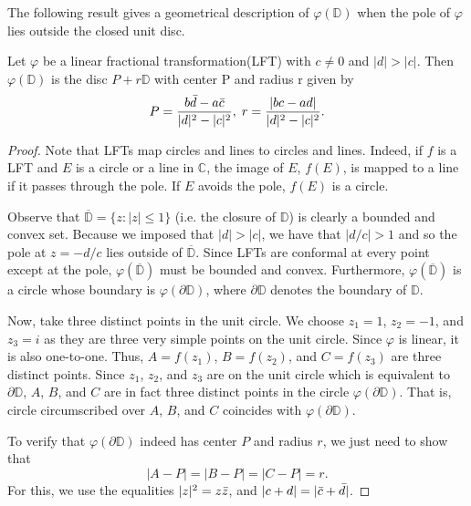 The following result gives a geometrical description of $\varphi(\mathbb{D})$ when the pole of $\varphi$ lies outside the closed unit disc.

\begin{lemma}
Let $\varphi$ be a linear fractional transformation(LFT) with $c \neq 0$ and $|d| > |c|$.  Then $\varphi(\mathbb{D})$ is the disc $P+r\mathbb{D}$ with center P and radius r given by
\[P = \frac{b\bar{d} - a\bar{c}}{|d|^2 - |c|^2}, \;r = \frac{|bc - ad|}{|d|^2 - |c|^2}.\]
\end{lemma}

\begin{proof}
Note that LFTs map circles and lines to circles and lines.  Indeed, if $f$ is a LFT and $E$ is a circle or a line in $\mathbb{C}$, the image of $E$, $f(E)$, is mapped to a line if it passes through the pole.  If $E$ avoids the pole, $f(E)$ is a circle.

Observe that $\overbar{\mathbb{D}} = \{z:|z| \leq 1\}$ (i.e. the closure of $\mathbb{D}$) is clearly a bounded and convex set.  Because we imposed that $|d| > |c|$, we have that $|d/c| > 1$ and so the pole at $z = -d/c$ lies outside of $\overbar{\mathbb{D}}$.  Since LFTs are conformal at every point except at the pole, $\varphi(\overbar{\mathbb{D}})$ must be bounded and convex.  Furthermore, $\varphi(\overbar{\mathbb{D}})$ is a circle whose boundary is $\varphi(\partial\mathbb{D})$, where $\partial\mathbb{D}$ denotes the boundary of $\mathbb{D}$.

Now, take three distinct points in the unit circle.  We choose $z_1 = 1$, $z_2 = -1$, and $z_3 = i$ as they are three very simple points on the unit circle.  Since $\varphi$ is linear, it is also one-to-one.  Thus, $A = f(z_1)$, $B = f(z_2)$, and $C = f(z_3)$ are three distinct points.  Since $z_1$, $z_2$, and $z_3$ are on the unit circle which is equivalent to $\partial\mathbb{D}$, $A$, $B$, and $C$ are in fact three distinct points in the circle $\varphi(\partial\mathbb{D})$.  That is, circle circumscribed over $A$, $B$, and $C$ coincides with $\varphi(\partial\mathbb{D})$.

To verify that $\varphi(\partial\mathbb{D})$ indeed has center $P$ and radius $r$, we just need to show that 
\[|A-P| = |B-P| = |C-P| = r.\]
For this, we use the equalities $|z|^2 = z\bar{z}$, and $|c + d| = |\bar{c} + \bar{d}|$.


\end{proof}
